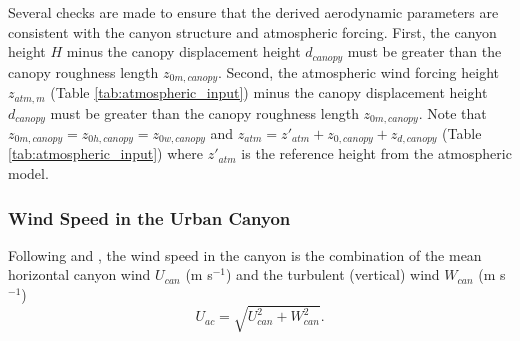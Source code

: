 \documentclass[12pt,authoryear]{elsarticle}
\numberwithin{equation}{section} %
\begin{document}
Several checks are made to ensure that the derived aerodynamic parameters are consistent with the canyon structure and atmospheric forcing. First, the canyon height $H$ minus the canopy displacement height $d_{canopy}$ must be greater than the canopy roughness length $z_{0m,canopy}$. Second, the atmospheric wind forcing height $z_{atm,m}$ (Table \ref{tab:atmospheric_input}) minus the canopy displacement height $d_{canopy}$ must be greater than the canopy roughness length $z_{0m,canopy}$. Note that $z_{0m,canopy}=z_{0h,canopy}=z_{0w,canopy}$ and $z_{atm}=z'_{atm}+z_{0,canopy}+z_{d,canopy}$ (Table \ref{tab:atmospheric_input}) where $z'_{atm}$ is the reference height from the atmospheric model.

\subsubsection{Wind Speed in the Urban Canyon}
%
Following \cite{massonPhysicallyBasedSchemeUrban2000} and \cite{lemonsuModelingSurfaceEnergy2004}, the wind speed in the canyon is the combination of the mean horizontal canyon wind $U_{can}$ (m s$^{-1}$) and the turbulent (vertical) wind $W_{can}$ (m s$^{-1}$)
\begin{equation}
\label{eq:wind_3D}
U_{ac} = \sqrt{U_{can}^2+W_{can}^2}.
\end{equation}
\end{document}
